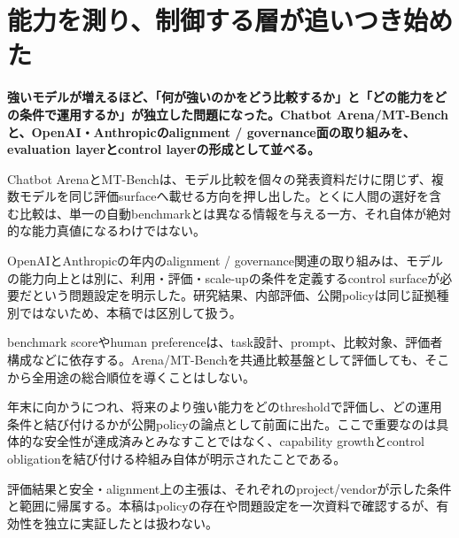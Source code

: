 \section{能力を測り、制御する層が追いつき始めた}
\label{pkg:evaluation-control}
\noindent\textbf{強いモデルが増えるほど、「何が強いのかをどう比較するか」と「どの能力をどの条件で運用するか」が独立した問題になった。Chatbot Arena/MT-Benchと、OpenAI・Anthropicのalignment / governance面の取り組みを、evaluation layerとcontrol layerの形成として並べる。}\autocite{src-14f8acc117f1,src-1df7a91d31ec,src-25adcaa1c831,src-394ea6d17701,src-8f63dfa1697f,src-a1c8df89a3c9,src-b276b4af9d56,src-b2d10cbd609c,src-b6a5fdb87e9f}

Chatbot ArenaとMT-Benchは、モデル比較を個々の発表資料だけに閉じず、複数モデルを同じ評価surfaceへ載せる方向を押し出した。とくに人間の選好を含む比較は、単一の自動benchmarkとは異なる情報を与える一方、それ自体が絶対的な能力真値になるわけではない。\autocite{src-14f8acc117f1,src-1df7a91d31ec,src-b2d10cbd609c}


OpenAIとAnthropicの年内のalignment / governance関連の取り組みは、モデルの能力向上とは別に、利用・評価・scale-upの条件を定義するcontrol surfaceが必要だという問題設定を明示した。研究結果、内部評価、公開policyは同じ証拠種別ではないため、本稿では区別して扱う。\autocite{src-25adcaa1c831,src-394ea6d17701,src-8f63dfa1697f,src-a1c8df89a3c9,src-b276b4af9d56,src-b6a5fdb87e9f}


benchmark scoreやhuman preferenceは、task設計、prompt、比較対象、評価者構成などに依存する。Arena/MT-Benchを共通比較基盤として評価しても、そこから全用途の総合順位を導くことはしない。\autocite{src-14f8acc117f1,src-1df7a91d31ec,src-b2d10cbd609c}


年末に向かうにつれ、将来のより強い能力をどのthresholdで評価し、どの運用条件と結び付けるかが公開policyの論点として前面に出た。ここで重要なのは具体的な安全性が達成済みとみなすことではなく、capability growthとcontrol obligationを結び付ける枠組み自体が明示されたことである。\autocite{src-25adcaa1c831,src-394ea6d17701,src-8f63dfa1697f,src-a1c8df89a3c9,src-b276b4af9d56,src-b6a5fdb87e9f}


\begin{claimboundary}
評価結果と安全・alignment上の主張は、それぞれのproject/vendorが示した条件と範囲に帰属する。本稿はpolicyの存在や問題設定を一次資料で確認するが、有効性を独立に実証したとは扱わない。\autocite{src-25adcaa1c831,src-a1c8df89a3c9,src-b276b4af9d56,src-b6a5fdb87e9f}
\end{claimboundary}
